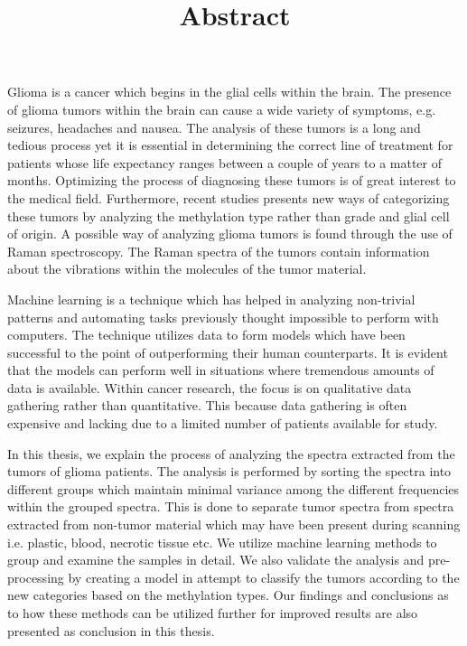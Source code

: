 \title{Abstract}

Glioma is a cancer which begins in the glial cells within the brain. The presence of glioma tumors within the brain can cause a wide variety of symptoms, e.g. seizures, headaches and nausea. The analysis of these tumors is a long and tedious process yet it is essential in determining the correct line of treatment for patients whose life expectancy ranges between a couple of years to a matter of months. Optimizing the process of diagnosing these tumors is of great interest to the medical field. Furthermore, recent studies presents new ways of categorizing these tumors by analyzing the methylation type rather than grade and glial cell of origin. A possible way of analyzing glioma tumors is found through the use of Raman spectroscopy. The Raman spectra of the tumors contain information about the vibrations within the molecules of the tumor material.

Machine learning is a technique which has helped in analyzing non-trivial patterns  and automating tasks previously thought impossible to perform with computers. The technique utilizes data to form models which have been successful to the point of outperforming their human counterparts. It is evident that the models can perform well in situations where tremendous amounts of data is available. Within cancer research, the focus is on qualitative data gathering rather than quantitative. This because data gathering is often expensive and lacking due to a limited number of patients available for study.  

In this thesis, we explain the process of analyzing the spectra extracted from the tumors of glioma patients. The analysis is performed by sorting the spectra into different groups which maintain minimal variance among the different frequencies within the grouped spectra. This is done to separate tumor spectra from spectra extracted from non-tumor material which may have been present during scanning i.e. plastic, blood, necrotic tissue etc. We utilize machine learning methods to group and examine the samples in detail. We also validate the analysis and pre-processing by creating a model in attempt to classify the tumors according to the new categories based on the methylation types. Our findings and conclusions as to how these methods can be utilized further for improved results are also presented as conclusion in this thesis.  

